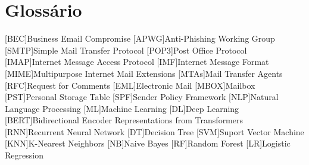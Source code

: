 \chapter{Glossário}

\footnotesize
\SingleSpacing

\begin{multicols}{2}
\begin{acronym}[AAAAAA]

	[BEC]{Business Email Compromise}
    [APWG]{Anti-Phishing Working Group}
	[SMTP]{Simple Mail Transfer Protocol}
	[POP3]{Post Office Protocol}
	[IMAP]{Internet Message Access Protocol}
	[IMF]{Internet Message Format}
	[MIME]{Multipurpose Internet Mail Extensions}
	[MTAs]{Mail Transfer Agents}
	[RFC]{Request for Comments}
	[EML]{Electronic Mail}
	[MBOX]{Mailbox}
	[PST]{Personal Storage Table}
	[SPF]{Sender Policy Framework}
	[NLP]{Natural Language Processing}
	[ML]{Machine Learning}
	[DL]{Deep Learning}
	[BERT]{Bidirectional Encoder Representations from Transformers}
	[RNN]{Recurrent Neural Network}
	[DT]{Decision Tree}
	[SVM]{Suport Vector Machine}
	[KNN]{K-Nearest Neighbors}
	[NB]{Naive Bayes}
	[RF]{Random Forest}
	[LR]{Logistic Regression}

\end{acronym}
\end{multicols}

